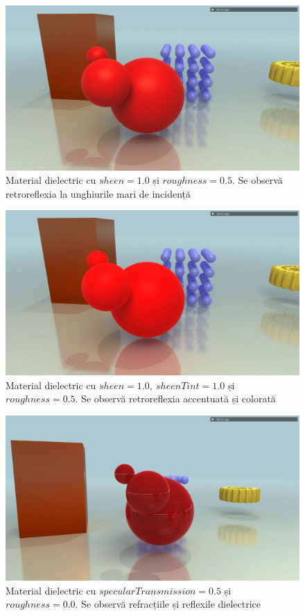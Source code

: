 \documentclass[12pt,a4paper]{report}
\numberwithin{equation}{section} %
\begin{document}
\begin{figure}[!htb]
	\centering
	\includegraphics[width=\textwidth]{pics/demo-sheen-1.0.png}
	\caption{Material dielectric cu $sheen = 1.0$ și $roughness = 0.5$. Se observă retroreflexia la unghiurile mari de incidență}
	\label{fig:demo-sheen-1.0}
\end{figure}
\begin{figure}[!htb]
	\centering
	\includegraphics[width=\textwidth]{pics/demo-sheenTint-1.0.png}
	\caption{Material dielectric cu $sheen = 1.0,\ sheenTint = 1.0$ și $roughness = 0.5$. Se observă retroreflexia accentuată și colorată}
	\label{fig:demo-sheenTint-1.0}
\end{figure}
\begin{figure}[!htb]
	\centering
	\includegraphics[width=\textwidth]{pics/demo-trans-0.5.png}
	\caption{Material dielectric cu $specularTransmission = 0.5$ și $roughness = 0.0$. Se observă refracțiile și reflexile dielectrice}
	\label{fig:demo-trans-0.5}
\end{figure}
\end{document}
